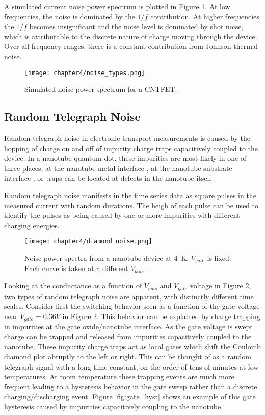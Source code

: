 A simulated current noise power spectrum is plotted in Figure \ref{fig:simulated_noise}. At low frequencies, the noise is dominated by the $1/f$ contribution. At higher frequencies the $1/f$ becomes insignificant and the noise level is dominated by shot noise, which is attributable to the discrete nature of charge moving through the device. Over all frequency ranges, there is a constant contribution from Johnson thermal noise.

\begin{figure}
    \centering
    \texttt{[image: chapter4/noise\_types.png]}
    \caption{Simulated noise power spectrum for a CNTFET.}
    \label{fig:simulated_noise}
\end{figure}

\subsection{Random Telegraph Noise}
\label{sec:RTN}

Random telegraph noise in electronic transport measurements is caused by the hopping of charge on and off of impurity charge traps capacitively coupled to the device. In a nanotube quantum dot, these impurities are most likely in one of three places; at the nanotube-metal interface \cite{Liu 2006}, at the nanotube-substrate interface \cite{Liu2006, Sydoruk2014}, or traps can be located at defects in the nanotube itself \cite{Stokes2010}.

Random telegraph noise manifests in the time series data as square pulses in the measured current with random durations. The heigh of each pulse can be used to identify the pulses as being caused by one or more impurities with different charging energies.

\begin{figure}
    \centering
    \texttt{[image: chapter4/diamond\_noise.png]}
    \caption{Noise power spectra from a nanotube device at \SI{4}{\kelvin}. $V_{gate}$ is fixed. Each curve is taken at a different $V_{bias}.$.}
    \label{fig:diamond_noise}
\end{figure}

Looking at the conductance as a function of $V_{bias}$ and $V_{gate}$ voltage in Figure \ref{fig:diamond_noise}, two types of random telegraph noise are apparent, with distinctly different time scales. Consider first the switching behavior seen as a function of the gate voltage near $V_{gate} = 0.36V$ in Figure \ref{fig:diamond_noise}. This behavior can be explained by charge trapping in impurities at the gate oxide/nanotube interface. As the gate voltage is swept charge can be trapped and released from impurities capacitively coupled to the nanotube. These impurity charge traps act as local gates which shift the Coulomb diamond plot abruptly to the left or right. This can be thought of as a random telegraph signal with a long time constant, on the order of tens of minutes at low temperatures. At room temperature these trapping events are much more frequent leading to a hysteresis behavior in the gate sweep rather than a discrete charging/discharging event. Figure \ref{fig:gate_hyst} shows an example of this gate hysteresis caused by impurities capacitively coupling to the nanotube.

